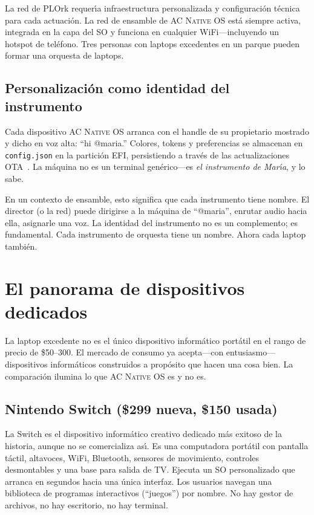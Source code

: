 \documentclass[10pt,letterpaper,twocolumn]{article}
\newcommand{\acos}{\textsc{AC Native OS}}
\begin{document}
La red de PLOrk requer\'{\i}a infraestructura personalizada y configuraci\'{o}n t\'{e}cnica para cada actuaci\'{o}n. La red de ensamble de \acos{} est\'{a} siempre activa, integrada en la capa del SO y funciona en cualquier WiFi---incluyendo un hotspot de tel\'{e}fono. Tres personas con laptops excedentes en un parque pueden formar una orquesta de laptops.

\subsection{Personalizaci\'{o}n como identidad del instrumento}

Cada dispositivo \acos{} arranca con el handle de su propietario mostrado y dicho en voz alta: ``hi @maria.'' Colores, tokens y preferencias se almacenan en \texttt{config.json} en la partici\'{o}n EFI, persistiendo a trav\'{e}s de las actualizaciones OTA~\citep{scudder2026os}. La m\'{a}quina no es un terminal gen\'{e}rico---es \emph{el instrumento de Mar\'{\i}a}, y lo sabe.

En un contexto de ensamble, esto significa que cada instrumento tiene nombre. El director (o la red) puede dirigirse a la m\'{a}quina de ``@maria'', enrutar audio hacia ella, asignarle una voz. La identidad del instrumento no es un complemento; es fundamental. Cada instrumento de orquesta tiene un nombre. Ahora cada laptop tambi\'{e}n.


\section{El panorama de dispositivos dedicados}
\label{sec:devices}

La laptop excedente no es el \'{u}nico dispositivo inform\'{a}tico port\'{a}til en el rango de precio de \$50--300. El mercado de consumo ya acepta---con entusiasmo---dispositivos inform\'{a}ticos construidos a prop\'{o}sito que hacen una cosa bien. La comparaci\'{o}n ilumina lo que \acos{} es y no es.

\subsection{Nintendo Switch (\$299 nueva, \$150 usada)}

La Switch es el dispositivo inform\'{a}tico creativo dedicado m\'{a}s exitoso de la historia, aunque no se comercializa as\'{\i}. Es una computadora port\'{a}til con pantalla t\'{a}ctil, altavoces, WiFi, Bluetooth, sensores de movimiento, controles desmontables y una base para salida de TV. Ejecuta un SO personalizado que arranca en segundos hacia una \'{u}nica interfaz. Los usuarios navegan una biblioteca de programas interactivos (``juegos'') por nombre. No hay gestor de archivos, no hay escritorio, no hay terminal.
\end{document}
